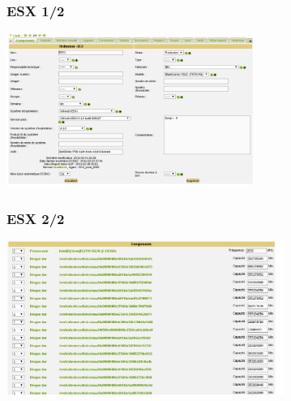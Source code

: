 \documentclass{beamer}
\begin{document}
\begin{frame}
\frametitle{ESX 1/2}


   \includegraphics[height=5cm]{./pics/esx1.png}
\end{frame}
%
\begin{frame}
\frametitle{ESX 2/2}


   \includegraphics[height=5cm]{./pics/esx2.png}
\end{frame}

%    
%
\end{document}
